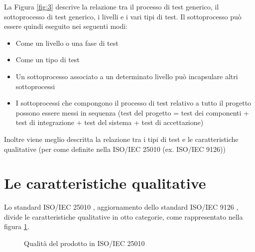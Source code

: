 \documentclass[../main.tex]{subfiles}
\begin{document}
La Figura \ref{fig:3} descrive la relazione tra il processo di test generico, il sottoprocesso di test generico, i livelli e i vari tipi di test.
Il sottoprocesso può essere quindi eseguito nei seguenti modi:
\begin{itemize}
\item Come un livello o una fase di test
\item Come un tipo di test
\item Un sottoprocesso associato a un determinato livello può incapsulare altri sottoprocessi
\item I sottoprocessi che compongono il processo di test relativo a tutto il progetto possono essere messi in sequenza (test del progetto = test dei componenti + test di integrazione + test del sistema + test di accettazione)
\end{itemize}
Inoltre viene meglio descritta la relazione tra i tipi di test e le caratteristiche qualitative (per come definite nella ISO/IEC 25010 (ex. ISO/IEC 9126)) \cite{iso29119}
\section{Le caratteristiche qualitative}
Lo standard ISO/IEC 25010 \cite{iso25010}, aggiornamento dello standard ISO/IEC 9126 \cite{iso9126}, divide le caratteristiche qualitative in otto categorie, come rappresentato nella figura \ref{fig:4}.

\begin{figure}[H]
\centering
{}
\caption{Qualità del prodotto in ISO/IEC 25010 \cite{iso25010}}\label{fig:4}
\end{figure}
\end{document}
